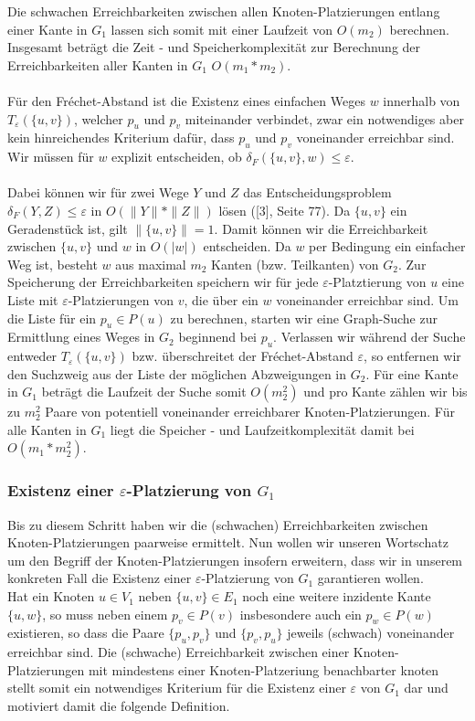 \documentclass[a4paper, 12pt, twoside]{article}
\theoremstyle{Format1} %
\begin{document}
Die schwachen Erreichbarkeiten zwischen allen Knoten-Platzierungen entlang einer Kante in $G_1$ lassen sich somit mit einer Laufzeit von $O(m_2)$ berechnen.
Insgesamt beträgt die Zeit - und Speicherkomplexität zur Berechnung der Erreichbarkeiten aller Kanten in $G_1$ $O(m_1*m_2)$.
\\
\\
Für den Fréchet-Abstand ist die Existenz eines einfachen Weges $w$ innerhalb von $T_{\varepsilon}(\{u,v\})$, welcher $p_u$ und $p_v$ miteinander verbindet,
zwar ein notwendiges aber kein hinreichendes Kriterium dafür, dass $p_u$ und $p_v$ voneinander erreichbar sind. Wir müssen für $w$ explizit entscheiden,
ob $\delta_F(\{u,v\}, w) \leq \varepsilon$.
\\
\\
Dabei können wir für zwei Wege $Y$ und $Z$ das Entscheidungsproblem $\delta_F(Y,Z) \leq \varepsilon$ in $O(\|Y\|*\|Z\|)$ lösen ([3], Seite 77).
Da $\{u,v\}$ ein Geradenstück ist, gilt $\|\{u,v\}\| = 1$. Damit können wir die Erreichbarkeit zwischen $\{u,v\}$ und $w$ in $O(|w|)$ entscheiden.
Da $w$ per Bedingung ein einfacher Weg ist, besteht $w$ aus maximal $m_2$ Kanten (bzw. Teilkanten) von $G_2$.
Zur Speicherung der Erreichbarkeiten speichern wir für jede $\varepsilon$-Platztierung von $u$ eine Liste mit $\varepsilon$-Platzierungen von $v$, die
über ein $w$ voneinander erreichbar sind. Um die Liste für ein $p_u \in P(u)$ zu berechnen, starten wir eine Graph-Suche zur Ermittlung eines
Weges in $G_2$ beginnend bei $p_u$. Verlassen wir während der Suche entweder $T_{\varepsilon}(\{u,v\})$ bzw. überschreitet der Fréchet-Abstand $\varepsilon$,
so entfernen wir den Suchzweig aus der Liste der möglichen Abzweigungen in $G_2$.
Für eine Kante in $G_1$ beträgt die Laufzeit der Suche somit $O(m_2^2)$ und pro Kante zählen wir bis zu $m_2^2$ Paare von potentiell voneinander erreichbarer Knoten-Platzierungen.
Für alle Kanten in $G_1$ liegt die Speicher - und Laufzeitkomplexität damit bei $O(m_1*m_2^2)$.

\subsubsection{Existenz einer $\varepsilon$-Platzierung von $G_1$}
Bis zu diesem Schritt haben wir die (schwachen) Erreichbarkeiten zwischen Knoten-Platzierungen paarweise ermittelt.
Nun wollen wir unseren Wortschatz um den Begriff der Knoten-Platzierungen insofern erweitern, dass wir in unserem konkreten Fall die Existenz einer
$\varepsilon$-Platzierung von $G_1$ garantieren wollen.
\\
Hat ein Knoten $u \in V_1$ neben $\{u,v\} \in E_1$ noch eine weitere inzidente Kante $\{u,w\}$, so muss neben einem $p_v \in P(v)$ insbesondere auch
ein $p_w \in P(w)$ existieren, so dass die Paare $\{p_u,p_v\}$ und $\{p_v,p_u\}$ jeweils (schwach) voneinander erreichbar sind. Die (schwache) Erreichbarkeit
zwischen einer Knoten-Platzierungen mit mindestens einer Knoten-Platzeriung benachbarter knoten stellt somit ein notwendiges Kriterium für die Existenz
einer $\varepsilon$ von $G_1$ dar und motiviert damit die folgende Definition.
\end{document}
